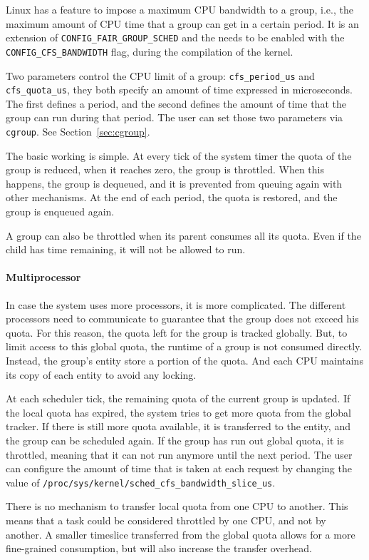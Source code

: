 Linux has a feature to impose a maximum CPU bandwidth to a group, i.e., the maximum amount of CPU time that a group can get in a certain period. It is an extension of \verb|CONFIG_FAIR_GROUP_SCHED| and the needs to be enabled with the \verb|CONFIG_CFS_BANDWIDTH| flag, during the compilation of the kernel.

Two parameters control the CPU limit of a group:  \verb|cfs_period_us| and \verb|cfs_quota_us|, they both specify an amount of time expressed in microseconds. The first defines a period, and the second defines the amount of time that the group can run during that period. The user can set those two parameters via \verb|cgroup|. See Section~\ref{sec:cgroup}.

The basic working is simple. At every tick of the system timer the quota of the group is reduced, when it reaches zero, the group is throttled. When this happens, the group is dequeued, and it is prevented from queuing again with other mechanisms. At the end of each period, the quota is restored, and the group is enqueued again.

A group can also be throttled when its parent consumes all its quota. Even if the child has time remaining, it will not be allowed to run.

\paragraph{Multiprocessor}
In case the system uses more processors, it is more complicated. The different processors need to communicate to guarantee that the group does not exceed his quota. For this reason, the quota left for the group is tracked globally. But, to limit access to this global quota, the runtime of a group is not consumed directly. Instead, the group's entity store a portion of the quota. And each CPU maintains its copy of each entity to avoid any locking.

At each scheduler tick, the remaining quota of the current group is updated. If the local quota has expired, the system tries to get more quota from the global tracker. If there is still more quota available, it is transferred to the entity, and the group can be scheduled again. If the group has run out global quota, it is throttled, meaning that it can not run anymore until the next period. The user can configure the amount of time that is taken at each request by changing the value of \verb|/proc/sys/kernel/sched_cfs_bandwidth_slice_us|.

There is no mechanism to transfer local quota from one CPU to another. This means that a task could be considered throttled by one CPU, and not by another. A smaller timeslice transferred from the global quota allows for a more fine-grained consumption, but will also increase the transfer overhead.

